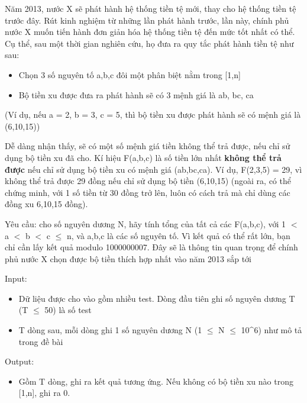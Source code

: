 



    Năm 2013, nước X sẽ phát hành hệ thống tiền tệ mới, thay cho hệ thống tiền tệ trước đây. Rút kinh nghiệm từ những lần phát hành trước, lần này, chính phủ nước X muốn tiến hành đơn giản hóa hệ thống tiền tệ đến mức tốt nhất có thể. Cụ thể, sau một thời gian nghiên cứu, họ đưa ra quy tắc phát hành tiền tệ như sau:   
\begin{itemize}
	\item 

      Chọn  3 số nguyên tố a,b,c đôi một phân biệt nằm trong [1,n]     
	\item 

      Bộ  tiền xu được đưa ra phát hành sẽ có 3 mệnh giá là  ab, bc, ca     
\end{itemize}

    (Ví dụ, nếu a = 2, b = 3, c = 5, thì bộ tiền xu được phát hành sẽ có mệnh giá là (6,10,15))   



    Dễ dàng nhận thấy, sẽ có một số mệnh giá tiền không thể trả được, nếu chỉ sử dụng bộ tiền xu đã cho. Kí hiệu F(a,b,c) là số tiền lớn nhất   \textbf{     không thể trả được    }    nếu chỉ sử dụng bộ tiền xu có mệnh giá (ab,bc,ca). Ví dụ, F(2,3,5) = 29, vì không thể trả được 29 đồng nếu chỉ sử dụng bộ tiền (6,10,15) (ngoài ra, có thể chứng minh, với 1 số tiền từ 30 đồng trở lên, luôn có cách trả mà chỉ dùng các đồng xu 6,10,15 đồng).   



    Yêu cầu: cho số nguyên dương N, hãy tính tổng của tất cả các F(a,b,c), với 1 $<$ a $<$ b $<$ c  $\le$  n, và a,b,c là các số nguyên tố. Vì kết quả có thể rất lớn, bạn chỉ cần lấy kết quả modulo 1000000007. Đây sẽ là thông tin quan trọng để chính phủ nước X chọn được bộ tiền thích hợp nhất vào năm 2013 sắp tới   



    Input:   
\begin{itemize}
	\item 

      Dữ  liệu được cho vào gồm nhiều test. Dòng đầu tiên ghi  số nguyên dương T (T  $\le$  50) là số test     
	\item 

      T  dòng sau, mỗi dòng ghi 1 số nguyên dương N (1  $\le$  N  $\le$   10\textasciicircum6) như mô tả trong đề bài     
\end{itemize}

    Output:   
\begin{itemize}
	\item 

      Gồm  T dòng, ghi ra kết quả tương ứng. Nếu không có bộ  tiền xu nào trong [1,n], ghi ra 0.     
\end{itemize}




